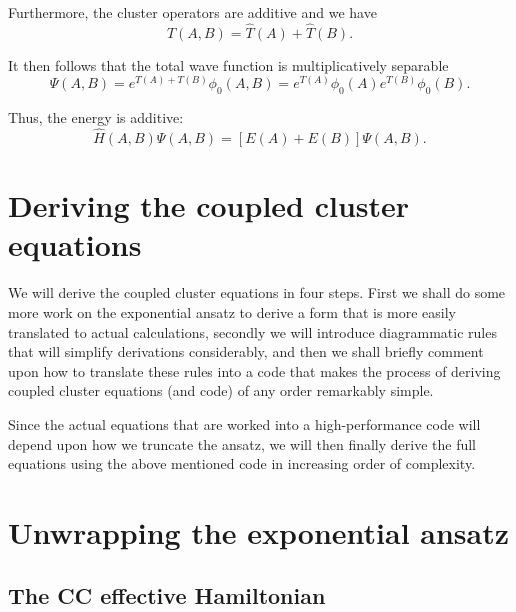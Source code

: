 Furthermore, the cluster operators are additive and we have
\begin{equation}
\hat{T}(A,B) = \hat{T}(A) + \hat{T}(B) .
\end{equation}

It then follows that the total wave function is multiplicatively separable
\begin{equation}
\Psi(A,B) = e^{T(A) + T(B)}\phi_0(A,B) = e^{T(A)}\phi_0(A)e^{T(B)}\phi_0(B).
\end{equation}

Thus, the energy is additive:
\begin{equation}
\hat{H}(A,B)\Psi(A,B) = [E(A) + E(B)]\Psi(A,B).
\end{equation}


\section{Deriving the coupled cluster equations}

We will derive the coupled cluster equations in four steps. First we
shall do some more work on the exponential ansatz to derive a form
that is more easily translated to actual calculations, secondly we
will introduce diagrammatic rules that will simplify derivations
considerably, and then we shall briefly comment upon how to translate
these rules into a code that makes the process of deriving coupled
cluster equations (and code) of any order remarkably simple.

Since the actual equations that are worked into a high-performance code
will depend upon how we truncate the ansatz, we will then finally
derive the full equations using the above mentioned code in increasing
order of complexity.

\section{Unwrapping the exponential ansatz}

\subsection{The CC effective Hamiltonian}

